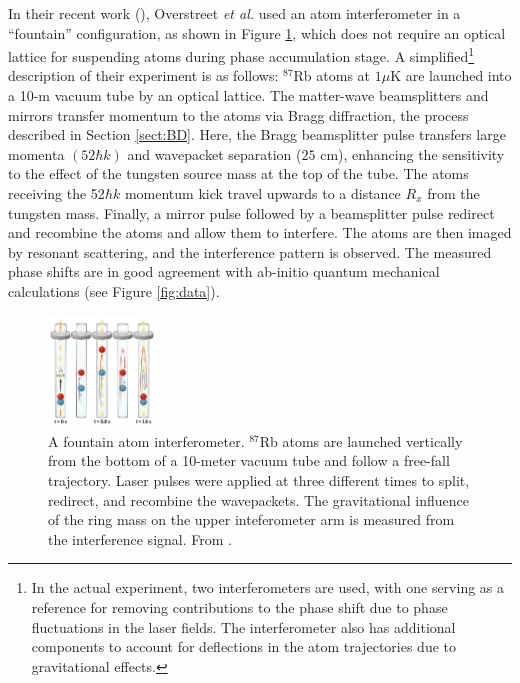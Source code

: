 \documentclass[reprint,
nofootinbib,
amsmath,amssymb,
aps]{revtex4-1}
\begin{document}
In their recent work (\cite{overstreet2022observation}), Overstreet \textit{et al.} used an atom interferometer in a ``fountain'' configuration, as shown in Figure \ref{fig:overstreet1}, which does not require an optical lattice for suspending atoms during phase accumulation stage.  A simplified\footnote{In the actual experiment, two interferometers are used, with one serving as a reference for removing contributions to the phase shift due to phase fluctuations in the laser fields. The interferometer also has additional components to account for deflections in the atom trajectories due to gravitational effects.} description of their experiment is as follows: $^{87}$Rb atoms at $1 \mu$K are launched into a 10-m vacuum tube by an optical lattice. The matter-wave beamsplitters and mirrors transfer momentum to the atoms via Bragg diffraction, the process described in Section \ref{sect:BD}.  Here, the Bragg beamsplitter pulse transfers large momenta $(52\hbar k)$ and wavepacket separation ($25$ cm), enhancing the sensitivity to the effect of the tungsten source mass at the top of the tube. The atoms receiving the 52$\hbar k$ momentum kick travel upwards to a distance $R_x$ from the tungsten mass. Finally, a mirror pulse followed by a beamsplitter pulse redirect and recombine the atoms and allow them to interfere. The atoms are then imaged by resonant scattering, and the interference pattern is observed. The measured phase shifts are in good agreement with ab-initio quantum mechanical calculations (see Figure \ref{fig:data}). 






\begin{figure}
	\includegraphics[width=0.25\textwidth]{overstreet1.png}
	\caption{A fountain atom interferometer. $^{87}$Rb atoms are launched vertically from the bottom of a 10-meter vacuum tube and follow a free-fall trajectory. Laser pulses were applied at three different times to split, redirect, and recombine the wavepackets. The gravitational influence of the ring mass on the upper inteferometer arm is measured from the interference signal. From \cite{roura2022quantum}.}
	\label{fig:overstreet1}
\end{figure}
\end{document}
